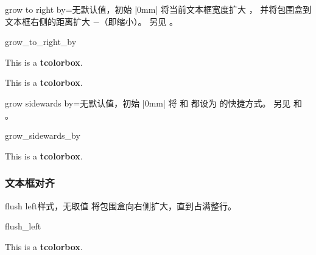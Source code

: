 \begin{docTcbKey}{grow to right by}{=}{无默认值，初始 |0mm|}
  将当前文本框宽度扩大 ，
  并将包围盒到文本框右侧的距离扩大 $-$（即缩小）。
  另见 。
\begin{exdispExample}[safety=2cm]{grow_to_right_by}

\begin{tcolorbox}[grow to right by=2cm,enhanced,show bounding box]
This is a \textbf{tcolorbox}.
\end{tcolorbox}

\bigskip

\begin{tcolorbox}[grow to right by=2cm,grow to left by=1cm,
  enhanced,show bounding box]
This is a \textbf{tcolorbox}.
\end{tcolorbox}
\end{exdispExample}
\end{docTcbKey}

\clearpage

\begin{docTcbKey}[][doc new=2018-03-22]{grow sidewards by}{=}{无默认值，初始 |0mm|}
  将  和 
  都设为  的快捷方式。
  另见  和 。
\begin{exdispExample}[safety=2cm]{grow_sidewards_by}

\begin{tcolorbox}[grow sidewards by=2cm,enhanced,show bounding box]
This is a \textbf{tcolorbox}.
\end{tcolorbox}
\end{exdispExample}
\end{docTcbKey}


\subsubsection{文本框对齐}

\begin{docTcbKey}[][doc new=2015-11-20]{flush left}{}{样式，无取值}
  将包围盒向右侧扩大，直到占满整行。
\begin{exdispExample}{flush_left}

\begin{tcolorbox}[flush left,width=5cm,enhanced,show bounding box]
This is a \textbf{tcolorbox}.
\end{tcolorbox}
\end{exdispExample}
\end{docTcbKey}



